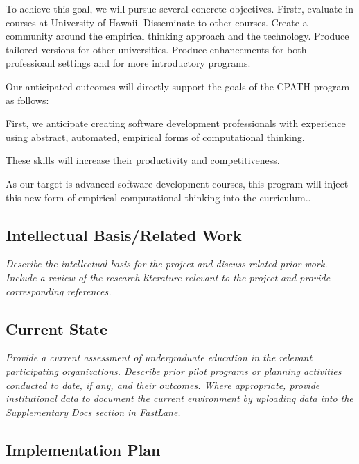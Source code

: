 To achieve this goal, we will pursue several concrete objectives. Firstr,
evaluate in courses at University of Hawaii.  Disseminate to other courses.
Create a community around the empirical thinking approach and the
technology.  Produce tailored versions for other universities.  Produce
enhancements for both professioanl settings and for more introductory
programs.

Our anticipated outcomes will directly support the goals of the CPATH program as follows:

First, we anticipate creating software development professionals with experience using abstract, automated, empirical forms of computational thinking.   

These skills will increase their productivity and competitiveness. 

As our target is advanced software development courses, this program will inject this new form of empirical computational thinking into the curriculum..


\subsection*{Intellectual Basis/Related Work}

{\em Describe the intellectual basis for the project and discuss related prior work.  Include a review of the research literature relevant to the project and provide corresponding references. }

\subsection*{Current State}

{\em Provide a current assessment of undergraduate education in the relevant participating organizations.  Describe prior pilot programs or planning activities conducted to date, if any, and their outcomes.  Where appropriate, provide institutional data to document the current environment by uploading data into the Supplementary Docs section in FastLane.}

\subsection*{Implementation Plan}

